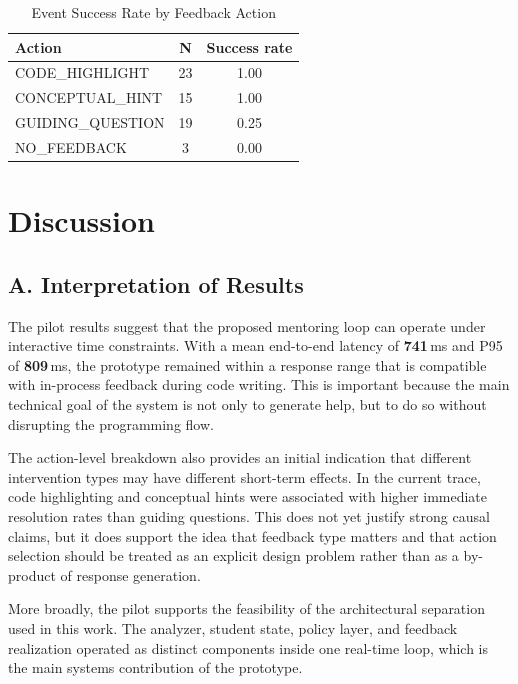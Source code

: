 \documentclass[conference]{IEEEtran}
\begin{document}
\begin{table}[t]
\centering
\caption{Event Success Rate by Feedback Action}
\label{tab:action_success}
\renewcommand{\arraystretch}{1.15}
\begin{tabular}{lcc}
\hline
\textbf{Action} & \textbf{N} & \textbf{Success rate} \\
\hline
CODE\_HIGHLIGHT & 23 & 1.00 \\
CONCEPTUAL\_HINT & 15 & 1.00 \\
GUIDING\_QUESTION & 19 & 0.25 \\
NO\_FEEDBACK & 3 & 0.00 \\
\hline
\end{tabular}
\end{table}

\section{Discussion}

\subsection*{A. Interpretation of Results}

The pilot results suggest that the proposed mentoring loop can operate under interactive time constraints. With a mean end-to-end latency of \textbf{741}\,ms and P95 of \textbf{809}\,ms, the prototype remained within a response range that is compatible with in-process feedback during code writing. This is important because the main technical goal of the system is not only to generate help, but to do so without disrupting the programming flow.

The action-level breakdown also provides an initial indication that different intervention types may have different short-term effects. In the current trace, code highlighting and conceptual hints were associated with higher immediate resolution rates than guiding questions. This does not yet justify strong causal claims, but it does support the idea that feedback type matters and that action selection should be treated as an explicit design problem rather than as a by-product of response generation.

More broadly, the pilot supports the feasibility of the architectural separation used in this work. The analyzer, student state, policy layer, and feedback realization operated as distinct components inside one real-time loop, which is the main systems contribution of the prototype.
\end{document}
